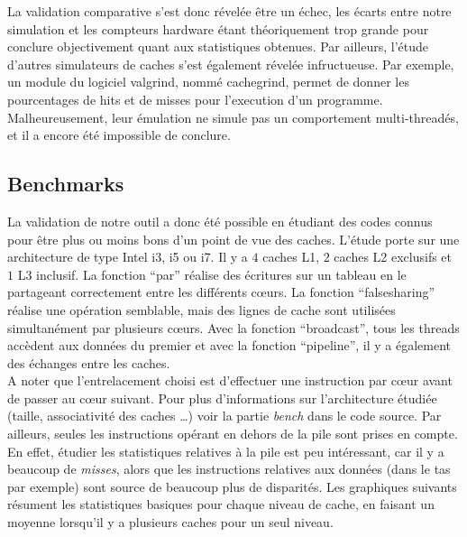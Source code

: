 La validation comparative s'est donc révelée être un échec, les écarts entre notre simulation et les compteurs hardware étant théoriquement trop grande pour conclure objectivement quant aux statistiques obtenues. Par ailleurs, l'étude d'autres simulateurs de caches s'est également révelée infructueuse. Par exemple, un module du logiciel valgrind, nommé cachegrind, permet de donner les pourcentages de hits et de misses pour l'execution d'un programme. Malheureusement, leur émulation ne simule pas un comportement multi-threadés, et il a encore été impossible de conclure.
 
\subsection{Benchmarks}
La validation de notre outil a donc été possible en étudiant des codes connus pour être plus ou moins bons d'un point de vue des caches. L'étude porte sur une architecture de type \textsf{Intel} i3, i5 ou i7. Il y a $4$ caches L1, $2$ caches L2 exclusifs et $1$ L3 inclusif. La fonction ``par'' réalise des écritures sur un tableau en le partageant correctement entre les différents c{\oe}urs. La fonction ``falsesharing'' réalise une opération semblable, mais des lignes de cache sont utilisées simultanément par plusieurs c{\oe}urs. Avec la fonction ``broadcast'', tous les threads accèdent aux données du premier et avec la fonction ``pipeline'', il y a également des échanges entre les caches. \\

A noter que l'entrelacement choisi est d'effectuer une instruction par c{\oe}ur avant de passer au c{\oe}ur suivant. Pour plus d'informations sur l'architecture étudiée (taille, associativité des caches \dots) voir la partie \emph{bench} dans le code source. Par ailleurs, seules les instructions opérant en dehors de la pile sont prises en compte. En effet, étudier les statistiques relatives à la pile est peu intéressant, car il y a beaucoup de \emph{misses}, alors que les instructions relatives aux données (dans le tas par exemple) sont source de beaucoup plus de disparités. Les graphiques suivants résument les statistiques basiques pour chaque niveau de cache, en faisant un moyenne lorsqu'il y a plusieurs caches pour un seul niveau.\\

